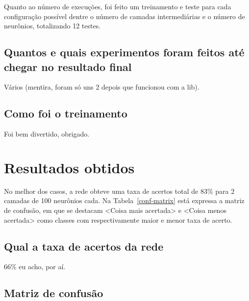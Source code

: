 \documentclass[twocolumn]{article}
\begin{document}
    Quanto ao número de execuções, foi feito um treinamento e teste para cada
    configuração possível dentre o número de camadas intermediárias e o número
    de neurônios, totalizando 12 testes.

    \subsection{Quantos e quais experimentos foram feitos até chegar no resultado final}

    Vários (mentira, foram só uns 2 depois que funcionou com a lib).

    \subsection{Como foi o treinamento}

    Foi bem divertido, obrigado.

    \section{Resultados obtidos}

    No melhor dos casos, a rede obteve uma taxa de acertos total de 83\% para 2
    camadas de 100 neurônios cada. Na Tabela~\ref{conf-matrix} está expressa a
    matriz de confusão, em que se destacam <Coisa mais acertada> e <Coisa menos
    acertada> como classes com respectivamente maior e menor taxa de acerto.

    \subsection{Qual a taxa de acertos da rede}

    66\% eu acho, por aí.

    \subsection{Matriz de confusão}
\end{document}
